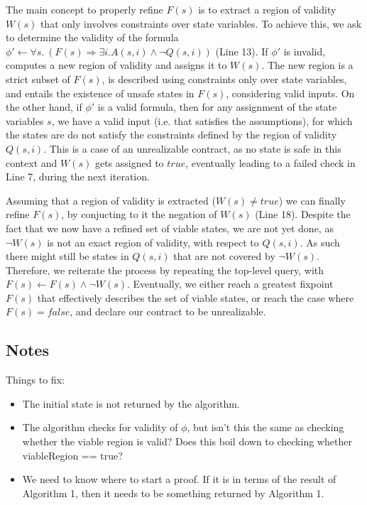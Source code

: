 The main concept to properly refine $F(s)$ is to extract a region of validity $W(s)$
that only involves constraints over state variables. To achieve this, we ask \aeval to determine
the validity of the formula $\phi' \gets \forall s. \ (F(s) \Rightarrow \exists
i. A(s,i) \land \lnot Q(s,i))$ (Line 13). If $\phi'$ is invalid, \aeval computes
a new region of validity and assigns it to $W(s)$. The new region is a strict subset of
$F(s)$, is described using constraints only over state variables, and entails
the existence of unsafe states in $F(s)$, considering valid inputs.
On the other hand, if $\phi'$ is a valid formula, then for any assignment of the state variables $s$, we have a valid input (i.e. that
satisfies the assumptions), for which the states are do not satisfy the constraints defined by the region
of validity $Q(s,i)$. This is a case of an unrealizable contract, as no state is
safe in this context and $W(s)$ gets assigned to $true$, eventually leading to a failed check in Line 7, during the next iteration.

Assuming that a region of validity is extracted ($W(s) \neq true$) we can finally refine $F(s)$, by conjucting to it the negation of $W(s)$ (Line 18).
Despite the fact that we now have a refined set of viable states, we are not yet done,
as $\lnot W(s)$ is not an exact region of validity, with respect to $Q(s,i)$. As
such there might still be states in $Q(s,i)$ that are not covered by $\lnot W(s)$. Therefore, we reiterate the
process by repeating the top-level \aeval query, with $F(s) \gets F(s) \land \lnot
W(s)$. Eventually, we either reach a greatest fixpoint $F(s)$ that effectively
describes the set of viable states, or reach the case where $F(s) = false$, and
declare our contract to be unrealizable.

\subsection{Notes}

Things to fix:
\begin{itemize}
\item The initial state is not returned by the algorithm.
\item The algorithm checks for validity of $\phi$, but isn't this the same as checking whether the viable region is valid?  Does this boil down to checking whether viableRegion == true?
\item We need to know where to start a proof.  If it is in terms of the result of Algorithm 1, then it needs to be something returned by Algorithm 1.
\end{itemize}


